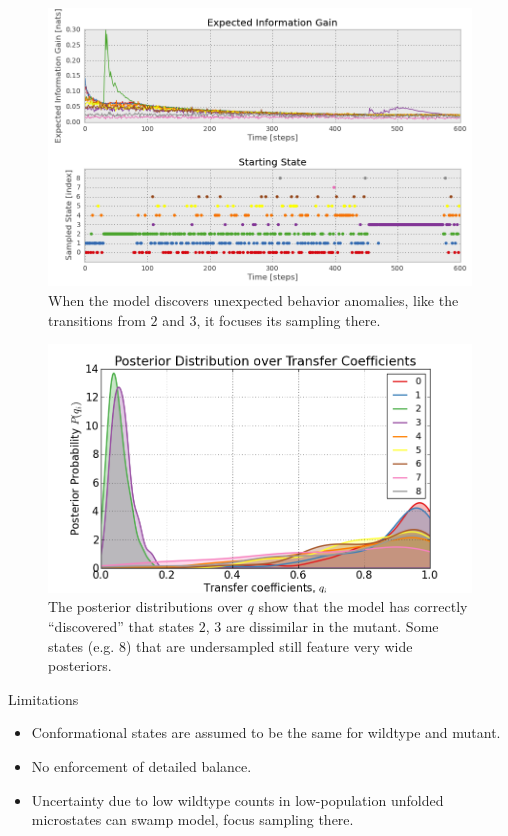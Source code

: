 \documentclass[final]{beamer}
\begin{document}
\begin{frame}{}
\begin{columns}[t]
\begin{column}{.3\linewidth}
\begin{figure}
 \includegraphics[width=\textwidth]{../code/9x9graph/plots/information_gain-tight.png}
    \caption{When the model discovers unexpected behavior anomalies, like the transitions from $2$ and $3$, it focuses its sampling there.}
\end{figure}

\begin{figure}
 \includegraphics[width=\textwidth]{../code/9x9graph/posterior_q.png}
    \caption{The posterior distributions over $q$ show that the model has correctly ``discovered'' that states $2$, $3$ are dissimilar in the mutant. Some states (e.g. $8$) that are undersampled still feature very wide posteriors.}
\end{figure}

    
\begin{block}{Limitations}
\begin{itemize}
\item Conformational states are assumed to be the same for wildtype and mutant.
\item No enforcement of detailed balance.
\item Uncertainty due to low wildtype counts in low-population unfolded microstates can swamp model, focus sampling there.
\end{itemize}
\end{block}
\vspace{0.5in}


\end{column}
\end{columns}
\end{frame}
\end{document}
